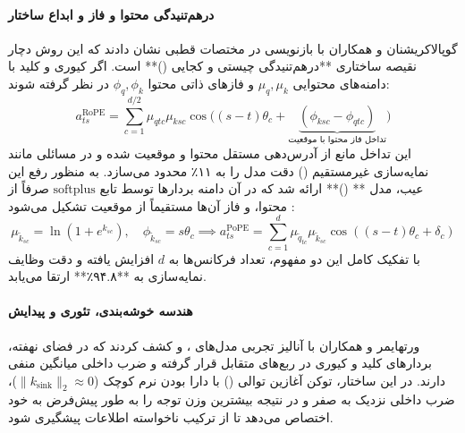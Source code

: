 \paragraph*{درهم‌تنیدگی محتوا و فاز و ابداع ساختار }
گوپالاکریشنان و همکاران \cite{gopalakrishnan2026decoupling} با بازنویسی  در مختصات قطبی نشان دادند که این روش دچار نقیصه ساختاری **درهم‌تنیدگی چیستی و کجایی ()** است. اگر کیوری و کلید با دامنه‌های محتوایی $\mu_q, \mu_k$ و فازهای ذاتی محتوا $\phi_q, \phi_k$ در نظر گرفته شوند:
\begin{equation}
    a_{ts}^{\text{RoPE}} = \sum_{c=1}^{d/2} \mu_{qtc} \mu_{ksc} \cos\Big( (s - t)\theta_c + \underbrace{(\phi_{ksc} - \phi_{qtc})}_{\text{تداخل فاز محتوا با موقعیت}} \Big)
\end{equation}
این تداخل مانع از آدرس‌دهی مستقل محتوا و موقعیت شده و در مسائلی مانند نمایه‌سازی غیرمستقیم () دقت مدل را به ۱۱٪ محدود می‌سازد. به منظور رفع این عیب، مدل ** ()** ارائه شد که در آن دامنه بردارها توسط تابع $\text{softplus}$ صرفاً از محتوا، و فاز آن‌ها مستقیماً از موقعیت تشکیل می‌شود \cite{gopalakrishnan2026decoupling}:
\begin{equation}
    \mu_{\tilde{k}_{sc}} = \ln(1 + e^{k_{sc}}), \quad \phi_{\tilde{k}_{sc}} = s\theta_c \implies a_{ts}^{\text{PoPE}} = \sum_{c=1}^d \mu_{\tilde{q}_{tc}} \mu_{\tilde{k}_{sc}} \cos((s - t)\theta_c + \delta_c)
\end{equation}
با تفکیک کامل این دو مفهوم، تعداد فرکانس‌ها به $d$ افزایش یافته و دقت وظایف نمایه‌سازی به **۹۴.۸٪** ارتقا می‌یابد.

\paragraph*{هندسه خوشه‌بندی، تئوری  و پیدایش }
ورتهایمر و همکاران \cite{wertheimer2026frayed} با آنالیز تجربی مدل‌های ،  و  کشف کردند که در فضای نهفته، بردارهای کلید و کیوری در ربع‌های متقابل قرار گرفته و ضرب داخلی میانگین منفی دارند. در این ساختار، توکن آغازین توالی () با دارا بودن نرم کوچک ($\|k_{\text{sink}}\|_2 \approx 0$)، ضرب داخلی نزدیک به صفر و در نتیجه بیشترین وزن توجه را به طور پیش‌فرض به خود اختصاص می‌دهد تا از ترکیب ناخواسته اطلاعات پیشگیری شود.

